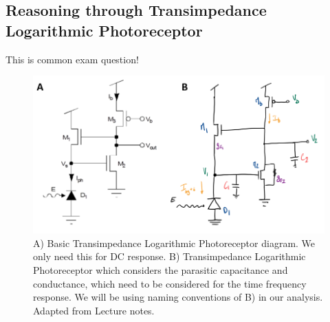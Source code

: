\subsection{Reasoning through Transimpedance Logarithmic Photoreceptor}

This is common exam question!

\begin{figure}[H]
    \centering
    \includegraphics[width=1\linewidth]{../../Figures/Transimpedance_Log_Photoreceptor_Full.PNG}
    \caption{A) Basic Transimpedance Logarithmic Photoreceptor diagram. We only need this for DC response. B) Transimpedance Logarithmic Photoreceptor which considers the parasitic capacitance and conductance, which need to be considered for the time frequency response. We will be using naming conventions of B) in our analysis. Adapted from Lecture notes.}
    \label{fig:Transimpedance_Log_Photoreceptor_Full}
\end{figure}


